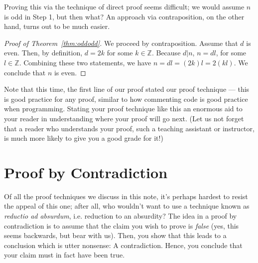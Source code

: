 \documentclass[11pt]{article}
\newcounter{thm}
\begin{document}
Proving this via the technique of direct proof seems difficult; we would assume $n$ is odd in Step 1, but then what? An approach via contraposition, on the other hand, turns out to be much easier.


\begin{proof}[Proof of Theorem~\ref{thm:oddodd}]
We proceed by contraposition. Assume that $d$ is even. Then, by definition, $d=2k$ for some $k\in \mathbb{Z}$. Because $d|n$, $n=dl$, for some $l \in \mathbb{Z}$.
Combining these two statements, we have $n=dl=(2k)l=2(kl)$.
We conclude that $n$ is even.
\end{proof}

Note that this time, the first line of our proof stated our proof technique --- this is good practice for any proof, similar to how commenting code is good practice when programming. Stating your proof technique like this an enormous aid to your reader in understanding where your proof will go next. (Let us not forget that a reader who understands your proof, such a teaching assistant or instructor, is much more likely to give you a good grade for it!)


\section{Proof by Contradiction}\label{scn:contradiction}

Of all the proof techniques we discuss in this note, it's perhaps hardest to resist the appeal of this one; after all, who wouldn't want to use a technique known as {\em reductio ad absurdum}, i.e. reduction to an absurdity? The idea in a proof by contradiction is to assume that the claim you wish to prove is \emph{false} (yes, this seems backwards, but bear with us). Then, you show that this leads to a conclusion which is utter nonsense: A contradiction. Hence, you conclude that your claim must in fact have been true.


\vspace{.2cm}
\end{document}
